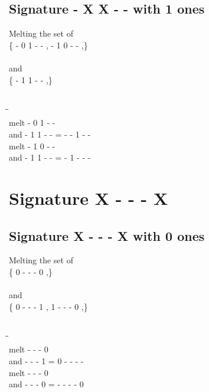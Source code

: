 \documentclass{article}
\begin{document}
\subsection{Signature - X X - - with 1 ones}
Melting the set of\\
\{ -  0  1  -  - , -  1  0  -  - ,\}\\\\
and\\
\{ -  1  1  -  - ,\}\\\\
\begin{tabbing}
\hspace{3cm}\=\hspace{3cm}\=\hspace{3cm}\\[1cm]
melt\> -  0  1  -  - \\
and\> -  1  1  -  - \>
 =  -  -  1  -  - \\[1mm]
melt\> -  1  0  -  - \\
and\> -  1  1  -  - \>
 =  -  1  -  -  - \\[1mm]
\end{tabbing}
\newpage
\section{Signature X - - - X }
\subsection{Signature X - - - X with 0 ones}
Melting the set of\\
\{ 0  -  -  -  0 ,\}\\\\
and\\
\{ 0  -  -  -  1 , 1  -  -  -  0 ,\}\\\\
\begin{tabbing}
\hspace{3cm}\=\hspace{3cm}\=\hspace{3cm}\\[1cm]
melt  -  -  -  0 \\
and  -  -  -  1 \>
 =  0  -  -  -  - \\[1mm]
melt  -  -  -  0 \\
and  -  -  -  0 \>
 =  -  -  -  -  0 \\[1mm]
\end{tabbing}
\newpage
\end{document}
